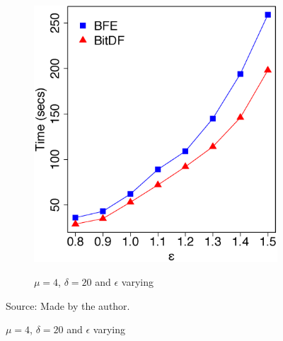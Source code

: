 {\begin{figure}[h!]
\begin{subfigure}[t]{0.48\textwidth}
        \caption{$\mu = 4$, $\delta = 20$ and $\epsilon$ varying}
        \includegraphics[width=\textwidth]{images/Trucks_n_4_l_20_varying_g.eps}
        \label{fig:trucks_vary_g}
    \end{subfigure}
    \label{fig:trucks_results}
    \footnotesize{Source: Made by the author.}
\end{figure}

}
